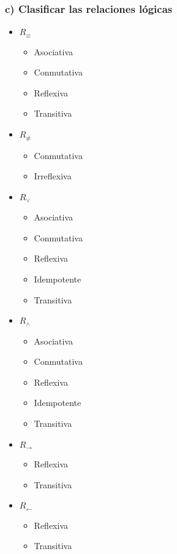 \documentclass{article}
\begin{document}
\subsubsection{c) Clasificar las relaciones lógicas}
\begin{itemize}
    \item $R_{\equiv}$
    \begin{itemize}
        \item Asociativa
        \item Conmutativa
        \item Reflexiva
        \item Transitiva
    \end{itemize}
    \item $R_{\not\equiv}$
    \begin{itemize}
        \item Conmutativa
        \item Irreflexiva
    \end{itemize}
    \item $R_{\vee}$
    \begin{itemize}
        \item Asociativa
        \item Conmutativa
        \item Reflexiva
        \item Idempotente
        \item Transitiva
    \end{itemize}
    \item $R_{\wedge}$
    \begin{itemize}
        \item Asociativa
        \item Conmutativa
        \item Reflexiva
        \item Idempotente
        \item Transitiva
    \end{itemize}
    \item $R_{\to}$
    \begin{itemize}
        \item Reflexiva
        \item Transitiva
    \end{itemize}
    \item $R_{\gets}$
    \begin{itemize}
        \item Reflexiva
        \item Transitiva
    \end{itemize}
\end{itemize}
\end{document}
